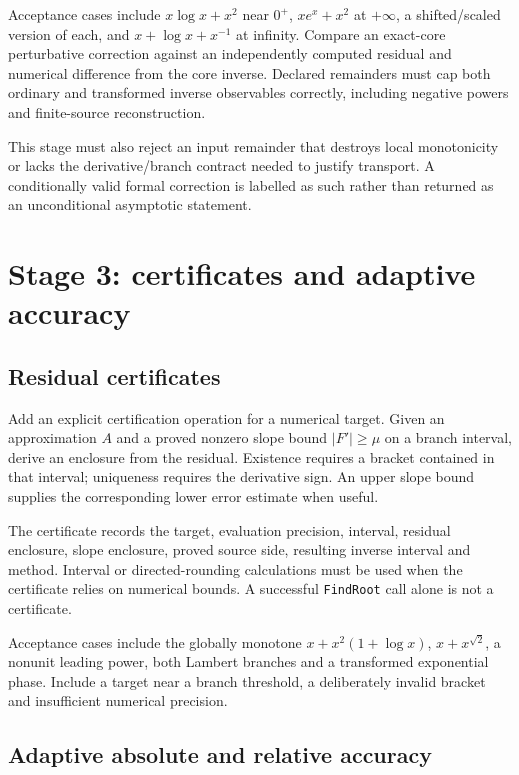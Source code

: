 \documentclass[11pt,a4paper]{article}
\newcommand{\wl}[1]{\texttt{#1}}
\begin{document}
Acceptance cases include $x\log x+x^2$ near $0^+$, $xe^x+x^2$ at $+\infty$, a shifted/scaled version of each, and $x+\log x+x^{-1}$ at infinity. Compare an exact-core perturbative correction against an independently computed residual and numerical difference from the core inverse. Declared remainders must cap both ordinary and transformed inverse observables correctly, including negative powers and finite-source reconstruction.

This stage must also reject an input remainder that destroys local monotonicity or lacks the derivative/branch contract needed to justify transport. A conditionally valid formal correction is labelled as such rather than returned as an unconditional asymptotic statement.

\section{Stage 3: certificates and adaptive accuracy}

\subsection{Residual certificates}

Add an explicit certification operation for a numerical target. Given an approximation $A$ and a proved nonzero slope bound $|F'|\ge\mu$ on a branch interval, derive an enclosure from the residual. Existence requires a bracket contained in that interval; uniqueness requires the derivative sign. An upper slope bound supplies the corresponding lower error estimate when useful.

The certificate records the target, evaluation precision, interval, residual enclosure, slope enclosure, proved source side, resulting inverse interval and method. Interval or directed-rounding calculations must be used when the certificate relies on numerical bounds. A successful \wl{FindRoot} call alone is not a certificate.

Acceptance cases include the globally monotone $x+x^2(1+\log x)$, $x+x^{\sqrt2}$, a nonunit leading power, both Lambert branches and a transformed exponential phase. Include a target near a branch threshold, a deliberately invalid bracket and insufficient numerical precision.

\subsection{Adaptive absolute and relative accuracy}
\end{document}
